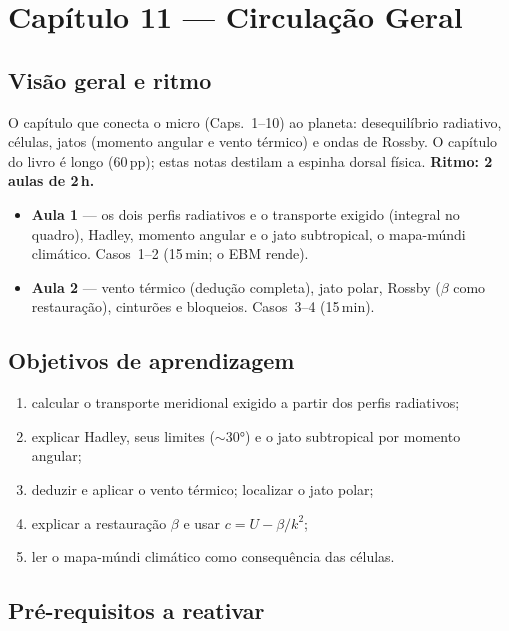 \section{Capítulo 11 --- Circulação Geral}

\subsection*{Visão geral e ritmo}

O capítulo que conecta o micro (Caps.~1--10) ao planeta: desequilíbrio
radiativo, células, jatos (momento angular e vento térmico) e ondas de
Rossby. O capítulo do livro é longo (60\,pp); estas notas destilam a
espinha dorsal física. \textbf{Ritmo: 2 aulas de 2\,h.}

\begin{itemize}
  \item \textbf{Aula 1} — os dois perfis radiativos e o transporte exigido
        (integral no quadro), Hadley, momento angular e o jato subtropical,
        o mapa-múndi climático. Casos~1--2 (15\,min; o EBM rende).
  \item \textbf{Aula 2} — vento térmico (dedução completa), jato polar,
        Rossby ($\beta$ como restauração), cinturões e bloqueios.
        Casos~3--4 (15\,min).
\end{itemize}

\subsection*{Objetivos de aprendizagem}

\begin{enumerate}
  \item calcular o transporte meridional exigido a partir dos perfis
        radiativos;
  \item explicar Hadley, seus limites ($\sim$30°) e o jato subtropical por
        momento angular;
  \item deduzir e aplicar o vento térmico; localizar o jato polar;
  \item explicar a restauração $\beta$ e usar $c = U - \beta/k^2$;
  \item ler o mapa-múndi climático como consequência das células.
\end{enumerate}

\subsection*{Pré-requisitos a reativar}

